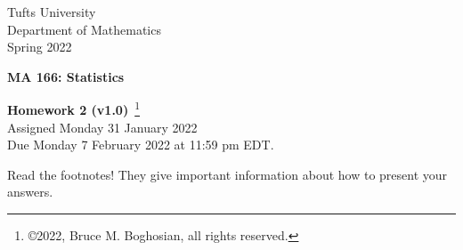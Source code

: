 \documentclass [12pt] {article}
\begin{document}
\thispagestyle{empty}
\begin{center}
Tufts University\\
Department of Mathematics\\
Spring 2022 \\
\end{center}
\begin{center}
{\bf MA 166: Statistics}\\
\end{center}
\begin{center}
{\bf\Large Homework 2 {\small (v1.0)}}~\footnote{\copyright 2022, Bruce M. Boghosian, all rights reserved.}\\
Assigned Monday 31 January 2022\\
Due Monday 7 February 2022 at 11:59 pm EDT.
\end{center}

Read the footnotes!  They give important information about how to present your answers.
\end{document}
